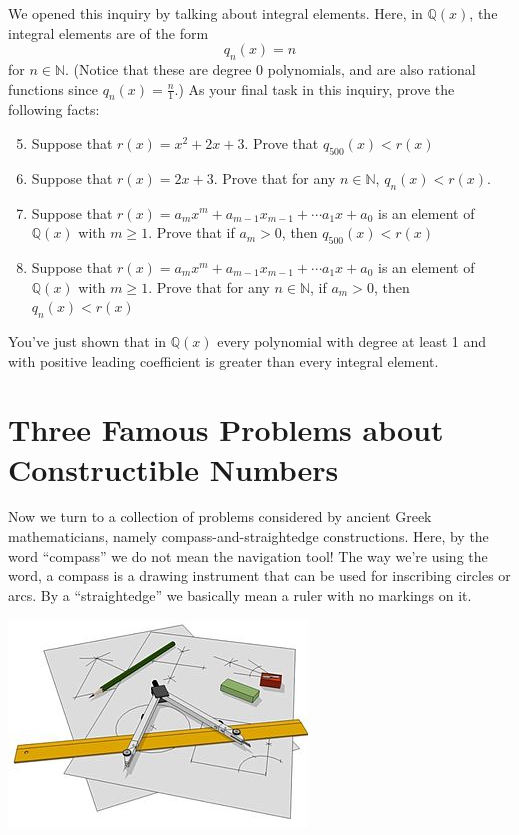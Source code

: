 \documentclass[11pt]{article}
\newenvironment{task}
	{\begin{mdframed}[linecolor=lightgray, linewidth=3pt]\raggedright}
	{\end{mdframed}}
\theoremstyle{definition}
\begin{document}
\begin{task}
We opened this inquiry by talking about integral elements. Here, in $\mathbb{Q}(x)$, the integral elements are of the form
\[ q_n(x) = n \]
for $n\in\mathbb{N}$. (Notice that these are degree 0 polynomials, and are also rational functions since $q_n(x) = \frac{n}{1}$.) As your final task in
this inquiry, prove the following facts:

\begin{enumerate}
    \setcounter{enumi}{4}
  \item Suppose that $r(x) =  x^2 + 2x + 3$. Prove that $q_{500}(x) < r(x)$
        \vspace{1.5in}
  \item Suppose that $r(x) =  2x + 3$. Prove that for any $n\in\mathbb{N}$, $q_n(x) < r(x)$.
        \vspace{1.5in}
  \item Suppose that $r(x) =  a_mx^m + a_{m-1}x_{m-1}+\cdots a_1x + a_0$ is an element
    of $\mathbb{Q}(x)$ with $m \geq 1$. Prove that if $a_m > 0$, then $q_{500}(x) < r(x)$
        \vspace{1.5in}
  \item Suppose that $r(x) =  a_mx^m + a_{m-1}x_{m-1}+\cdots a_1x + a_0$ is an element
    of $\mathbb{Q}(x)$ with $m \geq 1$. Prove that for any $n\in\mathbb{N}$, if $a_m > 0$, then $q_{n}(x) < r(x)$
        \vspace{1.5in}
\end{enumerate}

You've just shown that in $\mathbb{Q}(x)$ every polynomial with degree at least 1 and with positive leading coefficient is greater than every integral
element. 
\end{task}\newpage


\part{Three Famous Problems about Constructible Numbers}

Now we turn to a collection of problems considered by ancient Greek mathematicians, namely compass-and-straightedge constructions. 
Here, by the word ``compass'' we do not mean the navigation tool! The way we're using the word, a compass is a drawing instrument 
that can be used for inscribing circles or arcs. By a ``straightedge'' we basically mean a ruler with no markings on it. 

\begin{center}
\includegraphics{Images/straight_edge_compass_wikipedia.jpg}
\end{center}
\end{document}
